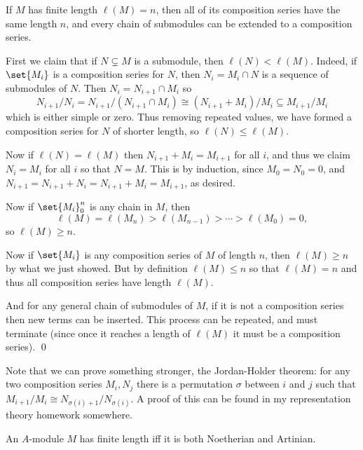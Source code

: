 \blemm

    If $M$ has finite length $\ell(M)=n$, then all of its composition series have the same length $n$, and every chain of submodules can be extended to a composition series.

\elemm

\bproof

    First we claim that if $N\subsetneq M$ is a submodule, then $\ell(N)<\ell(M)$.
    Indeed, if $\set{M_i}$ is a composition series for $N$, then $N_i=M_i\cap N$ is a sequence of submodules of $N$.
    Then $N_i=N_{i+1}\cap M_i$ so
    $$ N_{i+1}/N_i = N_{i+1}/(N_{i+1}\cap M_i) \cong (N_{i+1}+M_i)/M_i \subseteq M_{i+1}/M_i $$
    which is either simple or zero.
    Thus removing repeated values, we have formed a composition series for $N$ of shorter length, so $\ell(N)\leq\ell(M)$.

    Now if $\ell(N)=\ell(M)$ then $N_{i+1}+M_i=M_{i+1}$ for all $i$, and thus we claim $N_i=M_i$ for all $i$ so that $N=M$.
    This is by induction, since $M_0=N_0=0$, and $N_{i+1}=N_{i+1}+N_i=N_{i+1}+M_i=M_{i+1}$, as desired.

    Now if $\set{M_i}_0^n$ is any chain in $M$, then
    $$ \ell(M) = \ell(M_n) > \ell(M_{n-1}) > \cdots > \ell(M_0) = 0, $$
    so $\ell(M)\geq n$.

    Now if $\set{M_i}$ is any composition series of $M$ of length $n$, then $\ell(M)\geq n$ by what we just showed.
    But by definition $\ell(M)\leq n$ so that $\ell(M)=n$ and thus all composition series have length $\ell(M)$.

    And for any general chain of submodules of $M$, if it is not a composition series then new terms can be inserted.
    This process can be repeated, and must terminate (since once it reaches a length of $\ell(M)$ it must be a composition series).
    \qed

\eproof

\bnote

    Note that we can prove something stronger, the {\emphcolor Jordan-Holder theorem}: for any two composition series $M_i,N_j$ there is a permutation $\sigma$ between $i$ and $j$
    such that $M_{i+1}/M_i\cong N_{\sigma(i)+1}/N_{\sigma(i)}$.
    A proof of this can be found in my representation theory homework somewhere.

\enote

\blemm

    An $A$-module $M$ has finite length iff it is both Noetherian and Artinian.

\elemm


